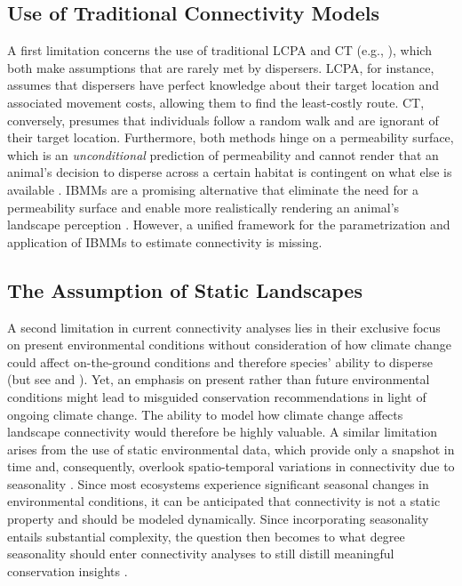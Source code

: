 \documentclass[../FinalThesis.tex]{subfiles}
\begin{document}
\subsection{Use of Traditional Connectivity Models}

A first limitation concerns the use of traditional LCPA and CT (e.g.,
\citealp{Elliot.2014, Mallory.2019, Brennan.2020}), which both make assumptions
that are rarely met by dispersers. LCPA, for instance, assumes that dispersers
have perfect knowledge about their target location and associated movement
costs, allowing them to find the least-costly route. CT, conversely, presumes
that individuals follow a random walk and are ignorant of their target location.
Furthermore, both methods hinge on a permeability surface, which is an
\textit{unconditional} prediction of permeability and cannot render that an
animal's decision to disperse across a certain habitat is contingent on what
else is available \citep{Signer.2017}. IBMMs are a promising alternative that
eliminate the need for a permeability surface \citep{Signer.2017, Diniz.2019,
UnnithanKumar.2022} and enable more realistically rendering an animal's
landscape perception \citep{Zeller.2020a, Zeller.2020}. However, a unified
framework for the parametrization and application of IBMMs to estimate
connectivity is missing.

\subsection{The Assumption of Static Landscapes}

A second limitation in current connectivity analyses lies in their exclusive
focus on present environmental conditions without consideration of how climate
change could affect on-the-ground conditions and therefore species' ability to
disperse (but see \citealp{Ashrafzadeh.2019} and \citealp{Luo.2021}). Yet, an
emphasis on present rather than future environmental conditions might lead to
misguided conservation recommendations in light of ongoing climate change. The
ability to model how climate change affects landscape connectivity would
therefore be highly valuable. A similar limitation arises from the use of static
environmental data, which provide only a snapshot in time and, consequently,
overlook spatio-temporal variations in connectivity due to seasonality
\citep{Simpkins.2017a, Zeller.2020a}. Since most ecosystems experience
significant seasonal changes in environmental conditions, it can be anticipated
that connectivity is not a static property and should be modeled dynamically.
Since incorporating seasonality entails substantial complexity, the question
then becomes to what degree seasonality should enter connectivity analyses to
still distill meaningful conservation insights \citep{Zeller.2020a}.
\end{document}
